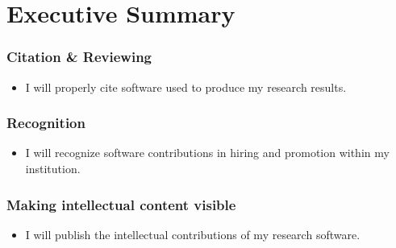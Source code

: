 \documentclass[a4paper,UKenglish]{dagman}
\renewcommand{\paragraph}[1]{\subsubsection*{#1}\xspace}
\begin{document}
\section*{Executive Summary}



\paragraph{Citation \& Reviewing}
\begin{itemize}
\item I will properly cite software used to produce my research results.
\end{itemize}

\paragraph{Recognition}
\begin{itemize}
\item I will recognize software contributions in hiring and promotion within my institution.
\end{itemize}

\paragraph{Making intellectual content visible}
\begin{itemize}
\item I will publish the intellectual contributions of my research software.


\end{itemize}
\end{document}
